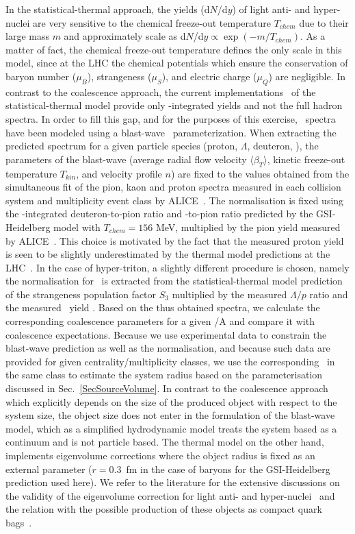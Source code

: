\documentclass[a4paper,11pt]{scrartcl} %
\begin{document}
In the statistical-thermal approach, the yields (d$N$/d$y$) of light anti- and hyper-nuclei are very sensitive to the chemical freeze-out temperature $T_{chem}$ due to their large mass $m$ and approximately scale as d$N$/d$y \propto \exp(-m/T_{chem})$. As a matter of fact, the chemical freeze-out temperature defines the only scale in this model, since at the LHC the chemical potentials which ensure the conservation of baryon number ($\mu_{B}$), strangeness ($\mu_{S}$), and electric charge ($\mu_{Q}$) are negligible.
In contrast to the coalescence approach, the current implementations~\cite{} of the statistical-thermal model provide only \pt-integrated yields and not the full hadron spectra. 
In order to fill this gap, and for the purposes of this exercise, \pt~spectra have been modeled using a blast-wave~\cite{} parameterization. When extracting the predicted spectrum for a given particle species (proton, $\Lambda$, deuteron, \hethree), the parameters of the blast-wave (average radial flow velocity $\langle\beta_{T}\rangle$, kinetic freeze-out temperature $T_{kin}$, and velocity profile $n$) are fixed to the values obtained from the simultaneous fit of the pion, kaon and proton spectra measured in each collision system and multiplicity event class by ALICE~\cite{}. 
The normalisation is fixed using the \pt-integrated deuteron-to-pion ratio and \hethree-to-pion ratio predicted by the GSI-Heidelberg model with $T_{chem} = 156$ MeV, multiplied by the pion yield measured by ALICE~\cite{}. 
This choice is motivated by the fact that the measured proton yield is seen to be slightly underestimated by the thermal model predictions at the LHC~\cite{}.
In the case of hyper-triton, a slightly different procedure is chosen, namely the normalisation for \hthreelambda~is extracted from the statistical-thermal model prediction of the strangeness population factor $S_{3}$ multiplied by the measured $\Lambda/p$ ratio \cite{} and the measured \hethree~yield \cite{}. Based on the thus obtained spectra, we calculate the corresponding coalescence parameters for a given \pt/A and compare it with coalescence expectations. Because we use experimental data to constrain the blast-wave prediction as well as the normalisation, and because such data are provided for given centrality/multiplicity classes, we use the corresponding \avdNdeta~in the same class to estimate the system radius based on the parameterisation discussed in Sec.~\ref{SecSourceVolume}. 
In contrast to the coalescence approach which explicitly depends on the size of the produced object with respect to the system size, the object size does not enter in the formulation of the blast-wave model, which as a simplified hydrodynamic model treats the system based as a continuum and is not particle based. The thermal model on the other hand, implements eigenvolume corrections where the object radius is fixed as an external parameter ($r=0.3$~fm in the case of baryons for the GSI-Heidelberg prediction used here). We refer to the literature for the extensive discussions on the validity of the eigenvolume correction for light anti- and hyper-nuclei~\cite{Volodya} and the relation with the possible production of these objects as compact quark bags~\cite{Andronic:2017}.
\end{document}
